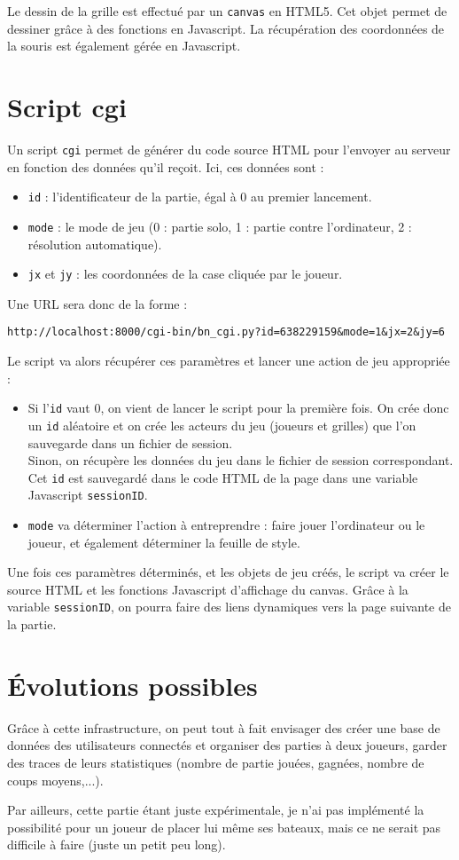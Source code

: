Le dessin de la grille est effectué par un \texttt{canvas} en HTML5. Cet objet permet de dessiner grâce à des fonctions en Javascript. La récupération des coordonnées de la souris est également gérée en Javascript.

\section{Script cgi}
Un script \texttt{cgi} permet de générer du code source HTML pour l'envoyer au serveur en fonction des données qu'il reçoit. Ici, ces données sont :
\begin{itemize}
\item \texttt{id} : l'identificateur de la partie, égal à 0 au premier lancement.
\item \texttt{mode} : le mode de jeu (0 : partie solo, 1 : partie contre l'ordinateur, 2 : résolution automatique).
\item \texttt{jx} et \texttt{jy} : les coordonnées de la case cliquée par le joueur. 
\end{itemize}
Une URL sera donc de la forme :
\begin{center}
\texttt{http://localhost:8000/cgi-bin/bn\_cgi.py?id=638229159\&mode=1\&jx=2\&jy=6}
\end{center}

\medskip

Le script va alors récupérer ces paramètres et lancer une action de jeu appropriée : 
\begin{itemize}
\item Si l'\texttt{id} vaut 0, on vient de lancer le script pour la première fois. On crée donc un \texttt{id} aléatoire et on crée les acteurs du jeu (joueurs et grilles) que l'on sauvegarde dans un fichier de session.\\
Sinon, on récupère les données du jeu dans le fichier de session correspondant.\\
Cet \texttt{id} est sauvegardé dans le code HTML de la page dans une variable Javascript \texttt{sessionID}.
\item \texttt{mode} va déterminer l'action à entreprendre : faire jouer l'ordinateur ou le joueur, et également déterminer la feuille de style.
\end{itemize}

Une fois ces paramètres déterminés, et les objets de jeu créés, le script va créer le source HTML et les fonctions Javascript d'affichage du canvas. Grâce à la variable \texttt{sessionID}, on pourra faire des liens dynamiques vers la page suivante de la partie. 

\section{Évolutions possibles}
Grâce à cette infrastructure, on peut tout à fait envisager des créer une base de données des utilisateurs connectés et organiser des parties à deux joueurs, garder des traces de leurs statistiques (nombre de partie jouées, gagnées, nombre de coups moyens,...).

Par ailleurs, cette partie étant juste expérimentale, je n'ai pas implémenté la possibilité pour un joueur de placer lui même ses bateaux, mais ce ne serait pas difficile à faire (juste un petit peu long). 